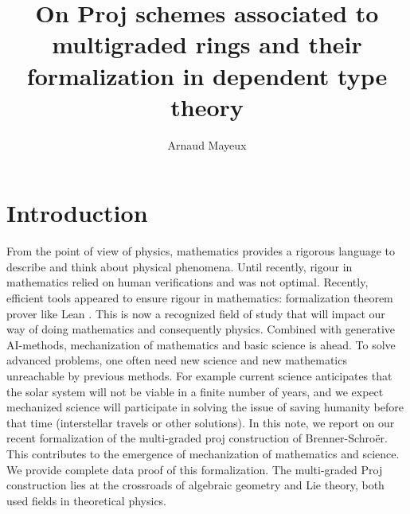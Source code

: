 \documentclass[graybox]{svmult}
\begin{document}
\title*{On Proj schemes associated to multigraded rings and their formalization in dependent type theory}
\author{Arnaud Mayeux}

%
%
\maketitle


\section*{Introduction}
From the point of view of physics, mathematics provides a rigorous language to describe and think about physical phenomena. 
Until recently, rigour in mathematics relied on human verifications and was not optimal. Recently, efficient tools appeared to ensure rigour in mathematics: formalization theorem prover like Lean \cite{dMal15, dMU21, Av24, Bu24}. 
This is now a recognized field of study that will impact our way of doing mathematics and consequently physics. Combined with generative AI-methods, mechanization of mathematics and basic science is ahead. 
To solve advanced problems, one often need new science and new mathematics unreachable by previous methods. For example current science anticipates that the solar system will not be viable in a finite number of years, and we expect mechanized science will participate in solving the issue of saving humanity before that time (interstellar travels or other solutions). In this note, we report on our recent formalization of the multi-graded proj construction of Brenner-Schroër. This contributes to the emergence of mechanization of mathematics and science. We provide complete data proof of this formalization. The multi-graded Proj construction lies at the crossroads of algebraic geometry and Lie theory, both used fields in theoretical physics.
\end{document}
